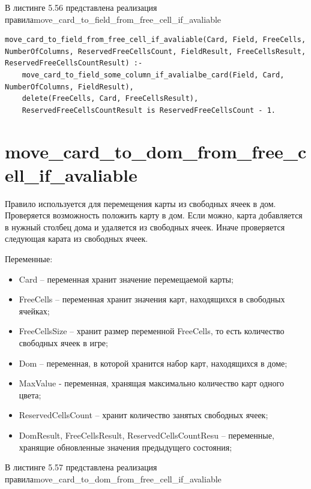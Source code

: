 \documentclass[12pt]{report}
\begin{document}
В листинге 5.56 представлена реализация правила\newline move\_card\_to\_field\_from\_free\_cell\_if\_avaliable

\begin{lstlisting}[label=some-code, caption=реализация правила move\_card\_to\_field\_from\_free\_cell\_if\_avaliable]
move_card_to_field_from_free_cell_if_avaliable(Card, Field, FreeCells, NumberOfColumns, ReservedFreeCellsCount, FieldResult, FreeCellsResult, ReservedFreeCellsCountResult) :-
	move_card_to_field_some_column_if_avalialbe_card(Field, Card, NumberOfColumns, FieldResult),
	delete(FreeCells, Card, FreeCellsResult),
	ReservedFreeCellsCountResult is ReservedFreeCellsCount - 1.
\end{lstlisting}
\section{move\_card\_to\_dom\_from\_free\_cell\_if\_avaliable}
Правило используется для перемещения карты из свободных ячеек в дом. Проверяется возможность положить карту в дом. Если можно, карта добавляется в нужный столбец дома и удаляется из свободных ячеек. Иначе проверяется следующая карата из свободных ячеек.

Переменные:
\begin{itemize}
\item Card – переменная хранит значение перемещаемой карты;
\item FreeCells – переменная хранит значения карт, находящихся в свободных ячейках;
\item FreeCellsSize – хранит размер переменной FreeCells, то есть количество свободных ячеек в игре;
\item Dom – переменная, в которой хранится набор карт, находящихся в доме;
\item MaxValue - переменная, хранящая максимально количество карт одного цвета;
\item ReservedCellsCount – хранит количество занятых свободных ячеек;
\item DomResult, FreeCellsResult, ReservedCellsCountResu – переменные, хранящие обновленные значения предыдущего состояния;
\end{itemize}

В листинге 5.57 представлена реализация правила\newline move\_card\_to\_dom\_from\_free\_cell\_if\_avaliable
\end{document}
